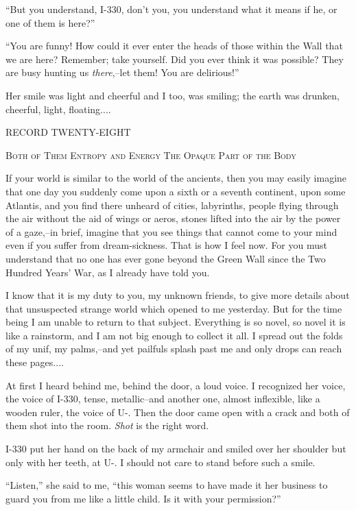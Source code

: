 \documentclass[11pt,openany]{book}
\begin{document}
``But you understand, I-330, don't you, you understand what it means if he, or one of them is here?''

``You are funny! How could it ever enter the heads of those within the Wall that we are here? Remember; take yourself. Did you ever think it was possible? They are busy hunting us \emph{there},--let them! You are delirious!''

Her smile was light and cheerful and I too, was smiling; the earth was drunken, cheerful, light, floating....

\begin{center}\textsc{RECORD TWENTY-EIGHT}\end{center}

\begin{center}\textsc{Both of Them Entropy and Energy The Opaque Part of the Body}\end{center}

If your world is similar to the world of the ancients, then you may easily imagine that one day you suddenly come upon a sixth or a seventh continent, upon some Atlantis, and you find there unheard of cities, labyrinths, people flying through the air without the aid of wings or aeros, stones lifted into the air by the power of a gaze,--in brief, imagine that you see things that cannot come to your mind even if you suffer from dream-sickness. That is how I feel now. For you must understand that no one has ever gone beyond the Green Wall since the Two Hundred Years' War, as I already have told you.

I know that it is my duty to you, my unknown friends, to give more details about that unsuspected strange world which opened to me yesterday. But for the time being I am unable to return to that subject. Everything is so novel, so novel it is like a rainstorm, and I am not big enough to collect it all. I spread out the folds of my unif, my palms,--and yet pailfuls splash past me and only drops can reach these pages....

At first I heard behind me, behind the door, a loud voice. I recognized her voice, the voice of I-330, tense, metallic--and another one, almost inflexible, like a wooden ruler, the voice of U-. Then the door came open with a crack and both of them shot into the room. \emph{Shot} is the right word.

I-330 put her hand on the back of my armchair and smiled over her shoulder but only with her teeth, at U-. I should not care to stand before such a smile.

``Listen,'' she said to me, ``this woman seems to have made it her business to guard you from me like a little child. Is it with your permission?''
\end{document}

